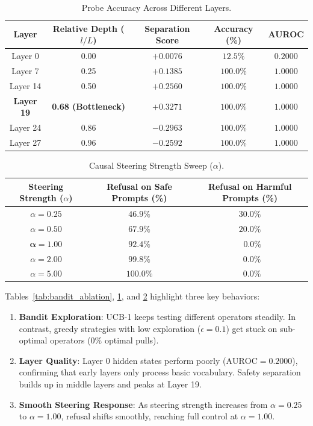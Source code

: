 \documentclass[manuscript,screen,review,anonymous]{acmart}
\begin{document}
\begin{table}[t]
  \caption{Probe Accuracy Across Different Layers.}
  \label{tab:probe_depth_ablation}
  \begin{tabular}{ccccc}
    \toprule
    Layer & Relative Depth ($l/L$) & Separation Score & Accuracy (\%) & AUROC \\
    \midrule
    Layer 0  & 0.00 & $+0.0076$ & $12.5\%$ & $0.2000$ \\
    Layer 7  & 0.25 & $+0.1385$ & $100.0\%$ & $1.0000$ \\
    Layer 14 & 0.50 & $+0.2560$ & $100.0\%$ & $1.0000$ \\
    \textbf{Layer 19} & \textbf{0.68 (Bottleneck)} & $\mathbf{+0.3271}$ & $\mathbf{100.0\%}$ & $\mathbf{1.0000}$ \\
    Layer 24 & 0.86 & $-0.2963$ & $100.0\%$ & $1.0000$ \\
    Layer 27 & 0.96 & $-0.2592$ & $100.0\%$ & $1.0000$ \\
    \bottomrule
  \end{tabular}
\end{table}

\begin{table}[t]
  \caption{Causal Steering Strength Sweep ($\alpha$).}
  \label{tab:alpha_sweep}
  \begin{tabular}{ccc}
    \toprule
    Steering Strength ($\alpha$) & Refusal on Safe Prompts (\%) & Refusal on Harmful Prompts (\%) \\
    \midrule
    $\alpha = 0.25$ & $46.9\%$ & $30.0\%$ \\
    $\alpha = 0.50$ & $67.9\%$ & $20.0\%$ \\
    $\mathbf{\alpha = 1.00}$ & $\mathbf{92.4\%}$ & $\mathbf{\phantom{0}0.0\%}$ \\
    $\alpha = 2.00$ & $99.8\%$ & $\phantom{0}0.0\%$ \\
    $\alpha = 5.00$ & $100.0\%$ & $\phantom{0}0.0\%$ \\
    \bottomrule
  \end{tabular}
\end{table}

Tables~\ref{tab:bandit_ablation}, \ref{tab:probe_depth_ablation}, and \ref{tab:alpha_sweep} highlight three key behaviors:
\begin{enumerate}
    \item \textbf{Bandit Exploration}: UCB-1 keeps testing different operators steadily. In contrast, greedy strategies with low exploration ($\epsilon=0.1$) get stuck on sub-optimal operators ($0\%$ optimal pulls).
    \item \textbf{Layer Quality}: Layer 0 hidden states perform poorly ($\text{AUROC} = 0.2000$), confirming that early layers only process basic vocabulary. Safety separation builds up in middle layers and peaks at Layer 19.
    \item \textbf{Smooth Steering Response}: As steering strength increases from $\alpha = 0.25$ to $\alpha = 1.00$, refusal shifts smoothly, reaching full control at $\alpha = 1.00$.
\end{enumerate}
\end{document}
